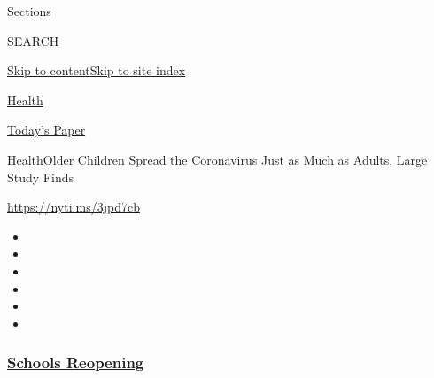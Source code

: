 Sections

SEARCH

\protect\hyperlink{site-content}{Skip to
content}\protect\hyperlink{site-index}{Skip to site index}

\href{https://www.nytimes3xbfgragh.onion/section/health}{Health}

\href{https://myaccount.nytimes3xbfgragh.onion/auth/login?response_type=cookie\&client_id=vi}{}

\href{https://www.nytimes3xbfgragh.onion/section/todayspaper}{Today's
Paper}

\href{/section/health}{Health}\textbar{}Older Children Spread the
Coronavirus Just as Much as Adults, Large Study Finds

\url{https://nyti.ms/3jpd7cb}

\begin{itemize}
\item
\item
\item
\item
\item
\item
\end{itemize}

\hypertarget{schools-reopening}{%
\subsubsection{\texorpdfstring{\href{https://www.nytimes3xbfgragh.onion/spotlight/schools-reopening?name=styln-coronavirus-schools-reopening\&region=TOP_BANNER\&variant=undefined\&block=storyline_menu_recirc\&action=click\&pgtype=Article\&impression_id=93cdfbf0-e3b4-11ea-96b6-7d25c67b750c}{Schools
Reopening}}{Schools Reopening}}\label{schools-reopening}}

